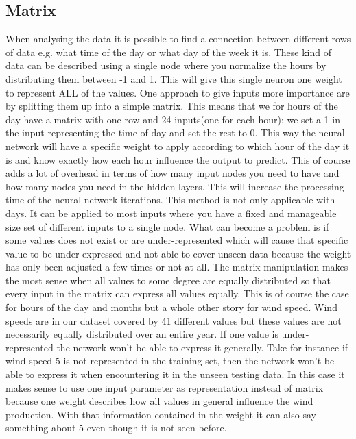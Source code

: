 \subsection{Matrix}
\label{sec:Matrix}
When analysing the data it is possible to find a connection between different rows of data e.g. what time of the day or what day of the week it is. These kind of data can be described using a single node where you normalize the hours by distributing them between -1 and 1. This will give this single neuron one weight to represent ALL of the values. One approach to give inputs more importance are by splitting them up into a simple matrix. This means that we for hours of the day have a matrix with one row and 24 inputs(one for each hour); we set a 1 in the input representing the time of day and set the rest to 0. This way the neural network will have a specific weight to apply according to which hour of the day it is and know exactly how each hour influence the output to predict. This of course adds a lot of overhead in terms of how many input nodes you need to have and how many nodes you need in the hidden layers. This will increase the processing time of the neural network iterations. This method is not only applicable with days. It can be applied to most inputs where you have a fixed and manageable size set of different inputs to a single node. What can become a problem is if some values does not exist or are under-represented which will cause that specific value to be under-expressed and not able to cover unseen data because the weight has only been adjusted a few times or not at all. The matrix manipulation makes the most sense when all values to some degree are equally distributed so that every input in the matrix can express all values equally. This is of course the case for hours of the day and months but a whole other story for wind speed. Wind speeds are in our dataset covered by 41 different values but these values are not necessarily equally distributed over an entire year. If one value is under-represented the network won't be able to express it generally. Take for instance if wind speed 5 is not represented in the training set, then the network won't be able to express it when encountering it in the unseen testing data. In this case it makes sense to use one input parameter as representation instead of matrix because one weight describes how all values in general influence the wind production. With that information contained in the weight it can also say something about 5 even though it is not seen before. 

